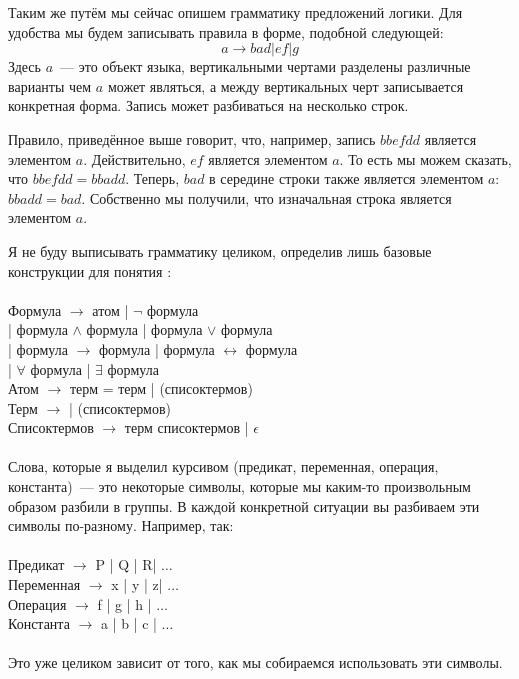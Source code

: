 Таким же путём мы сейчас опишем грамматику предложений логики. Для удобства мы будем записывать правила в форме, подобной следующей:
$$a \to bad | ef | g$$
Здесь $a$~--- это объект языка, вертикальными чертами разделены различные варианты чем $a$ может являться, а между вертикальных черт записывается конкретная форма. Запись может разбиваться на несколько строк.

\begin{example}
Правило, приведённое выше говорит, что, например, запись  $bbefdd$ является элементом $a$. Действительно, $ef$ является элементом $a$. То есть мы можем сказать, что $bbefdd = bbadd$. Теперь, $bad$ в середине строки также является элементом $a$: $bbadd = bad$. Собственно мы получили, что изначальная строка является элементом $a$.
\end{example}

Я не буду выписывать грамматику целиком, определив лишь базовые конструкции для понятия :\\
\\
Формула $\to$ атом | $\neg$ формула\\
\hspace*{2cm}| формула $\land$ формула | формула $\lor$ формула\\
\hspace*{2cm}| формула $\to$ формула | формула $\leftrightarrow$ формула\\
\hspace*{2cm}| $\forall$  формула | $\exists$  формула\\
Атом $\to$ терм = терм |  (списоктермов)\\
Терм $\to$  |  (списоктермов)\\
Списоктермов $\to$ терм списоктермов | $\epsilon$\\
\\
Слова, которые я выделил курсивом (предикат, переменная, операция, константа)~--- это некоторые символы, которые мы каким-то произвольным образом разбили в группы. В каждой конкретной ситуации вы разбиваем эти символы по-разному. Например, так:\\
\\
Предикат $\to$ P | Q | R| $\ldots$\\
Переменная $\to$ x | y | z| $\ldots$\\
Операция $\to$ f | g | h | $\ldots$\\
Константа $\to$ a | b | c | $\ldots$\\
\\
Это уже целиком зависит от того, как мы собираемся использовать эти символы.

